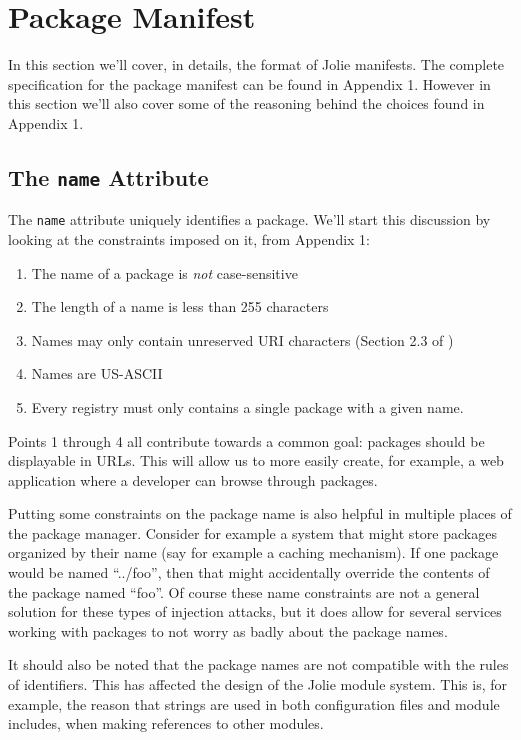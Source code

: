 \section{Package Manifest}
\label{sec:manifest}

In this section we'll cover, in details, the format of Jolie manifests. The
complete specification for the package manifest can be found in Appendix 1.
However in this section we'll also cover some of the reasoning behind the
choices found in Appendix 1.

\subsection{The {\tt name} Attribute}

The \texttt{name} attribute uniquely identifies a package. We'll
start this discussion by looking at the constraints imposed on it, from
Appendix 1:

\begin{enumerate}
\item
    The name of a package is \emph{not} case-sensitive
\item
    The length of a name is less than 255 characters
\item
    Names may only contain unreserved URI characters (Section 2.3 of
            \autocite{rfc3986})
\item
    Names are US-ASCII
\item
    Every registry must only contains a single package with a given name.
\end{enumerate}

Points 1 through 4 all contribute towards a common goal: packages should be
displayable in URLs. This will allow us to more easily create, for example,
a web application where a developer can browse through packages.

Putting some constraints on the package name is also helpful in multiple places
of the package manager. Consider for example a system that might store packages
organized by their name (say for example a caching mechanism). If one package
would be named ``../foo'', then that might accidentally override the contents
of the package named ``foo''. Of course these name constraints are not a
general solution for these types of injection attacks, but it does allow for
several services working with packages to not worry as badly about the package
names.

It should also be noted that the package names are not compatible with the
rules of identifiers. This has affected the design of the Jolie module system.
This is, for example, the reason that strings are used in both configuration
files and module includes, when making references to other modules.

